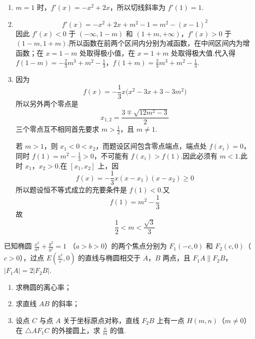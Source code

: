 \begin{solution}
\begin{enumerate}
\item \(m=1\) 时，\(f'(x)=-x^2+2x\)，所以切线斜率为 \(f'(1)=1\).

\item
\[
f'(x)=-x^2+2x+m^2-1=m^2-(x-1)^2
\]
因此 \(f'(x)<0\) 于 \((-\infty,1-m)\) 和 \((1+m,+\infty)\)，\(f'(x)>0\) 于 \((1-m,1+m)\).所以函数在前两个区间内分别为减函数，在中间区间内为增函数；在 \(x=1-m\) 处取得极小值，在 \(x=1+m\) 处取得极大值.代入得
\(f(1-m)=-\frac23m^3+m^2-\frac13\)，\(f(1+m)=\frac23m^3+m^2-\frac13\).

\item 因为
\[
f(x)=-\frac13x\bigl(x^2-3x+3-3m^2\bigr)
\]
所以另外两个零点是
\[
x_{1,2}=\frac{3\mp\sqrt{12m^2-3}}2
\]
三个零点互不相同首先要求 \(m>\frac12\)，且 \(m\ne1\).

若 \(m>1\)，则 \(x_1<0<x_2\)，而题设区间包含零点端点，端点处 \(f(x_i)=0\)，同时 \(f(1)=m^2-\frac13>0\)，不可能有 \(f(x_i)>f(1)\).因此必须有 \(m<1\).此时 \(x_1\)，\(x_2>0\).在 \([x_1,x_2]\) 上，因
\[
f(x)=-\frac13x(x-x_1)(x-x_2)\geqslant0
\]
所以题设恒不等式成立的充要条件是 \(f(1)<0\).又
\[
f(1)=m^2-\frac13
\]
故
\[
\frac12<m<\frac{\sqrt3}{3}
\]
\end{enumerate}
\end{solution}

\begin{problem}
已知椭圆 \(\frac{x^2}{a^2} + \frac{y^2}{b^2} = 1\) （\(a > b > 0\)）的两个焦点分别为 \(F_1(-c,0)\) 和 \(F_2(c,0)\)（\(c > 0\)），过点 \(E\left(\frac{a^2}{c}, 0\right)\) 的直线与椭圆相交于 \(A\)，\(B\) 两点，且 \(F_1A \parallel F_2B\)，\(|F_1A| = 2|F_2B|\).
\begin{enumerate}
\item 求椭圆的离心率；
\item 求直线 \(AB\) 的斜率；
\item 设点 \(C\) 与点 \(A\) 关于坐标原点对称，直线 \(F_{2}B\) 上有一点 \(H(m, n)\)（\(m \neq 0\)）在 \(\triangle AF_{1}C\) 的外接圆上，求 \(\frac{n}{m} \) 的值.
\end{enumerate}
\end{problem}

